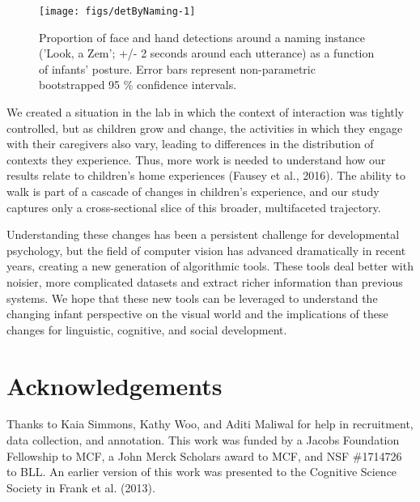 \documentclass[10pt, letterpaper]{article}
\newenvironment{CodeChunk}{}{}
\begin{document}
\begin{CodeChunk}
\begin{figure}[H]

{\centering \texttt{[image: figs/detByNaming-1]} 

}

\caption[Proportion of face and hand detections around a naming instance ('Look, a Zem']{Proportion of face and hand detections around a naming instance ('Look, a Zem'; +/- 2 seconds around each utterance) as a function of infants' posture. Error bars represent non-parametric bootstrapped 95 \% confidence intervals.}\label{fig:detByNaming}
\end{figure}
\end{CodeChunk}

We created a situation in the lab in which the context of interaction
was tightly controlled, but as children grow and change, the activities
in which they engage with their caregivers also vary, leading to
differences in the distribution of contexts they experience. Thus, more
work is needed to understand how our results relate to children's home
experiences (Fausey et al., 2016). The ability to walk is part of a
cascade of changes in children's experience, and our study captures only
a cross-sectional slice of this broader, multifaceted trajectory.

Understanding these changes has been a persistent challenge for
developmental psychology, but the field of computer vision has advanced
dramatically in recent years, creating a new generation of algorithmic
tools. These tools deal better with noisier, more complicated datasets
and extract richer information than previous systems. We hope that these
new tools can be leveraged to understand the changing infant perspective
on the visual world and the implications of these changes for
linguistic, cognitive, and social development.

\section{Acknowledgements}\label{acknowledgements}

Thanks to Kaia Simmons, Kathy Woo, and Aditi Maliwal for help in
recruitment, data collection, and annotation. This work was funded by a
Jacobs Foundation Fellowship to MCF, a John Merck Scholars award to MCF,
and NSF \#1714726 to BLL. An earlier version of this work was presented
to the Cognitive Science Society in Frank et al. (2013).

\vspace{1em}
\end{document}
